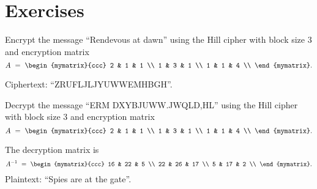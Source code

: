 \section*{Exercises}

\begin{enumialphparenastyle}

\begin{ex}
  Encrypt the message ``Rendevous at dawn'' using the Hill cipher with
  block size 3 and encryption matrix
  \begin{equation*}
    A ~=~ \begin{mymatrix}{ccc}
      2 & 1 & 1 \\
      1 & 3 & 1 \\
      1 & 1 & 4 \\
    \end{mymatrix}.
  \end{equation*}
  \begin{sol}
    Ciphertext: ``ZRUFLJLJYUWWEMHBGH''.
  \end{sol}
\end{ex}

\begin{ex}
  Decrypt the message ``ERM DXYBJUWW.JWQLD,HL'' using the Hill cipher with block size
  $3$ and encryption matrix
  \begin{equation*}
    A ~=~ \begin{mymatrix}{ccc}
      2 & 1 & 1 \\
      1 & 3 & 1 \\
      1 & 1 & 4 \\
    \end{mymatrix}.
  \end{equation*}
  \begin{sol}
    The decryption matrix is
    \begin{equation*}
      A^{-1} ~=~ \begin{mymatrix}{ccc}
        16 & 22 &  5 \\
        22 & 26 & 17 \\
        5  & 17 &  2 \\
      \end{mymatrix}.
    \end{equation*}
    Plaintext: ``Spies are at the gate''.
  \end{sol}
\end{ex}


\end{enumialphparenastyle}
